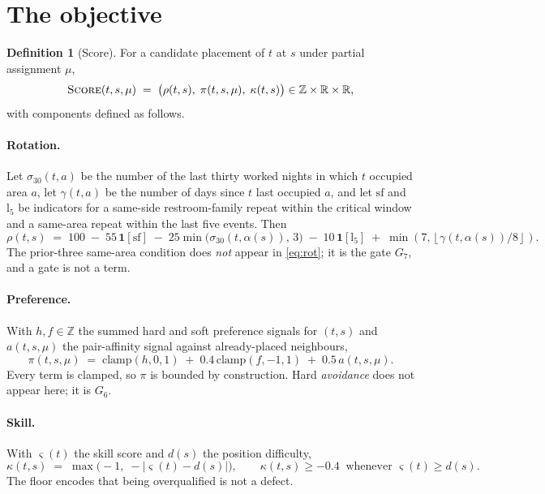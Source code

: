 \documentclass[11pt,a4paper]{article}
\theoremstyle{definition}
\newtheorem{definition}{Definition}
\theoremstyle{remark}
\newcommand{\ind}[1]{\mathbf{1}\!\left[#1\right]}
\newcommand{\score}{\textsc{Score}}
\begin{document}
\section{The objective}
\label{sec:objective}

\begin{definition}[Score]
For a candidate placement of $t$ at $s$ under partial assignment $\mu$,
\begin{equation}
\score(t, s, \mu) \;=\; \bigl(\rho(t,s),\; \pi(t,s,\mu),\; \kappa(t,s)\bigr)
\in \mathbb{Z} \times \mathbb{R} \times \mathbb{R},
\end{equation}
with components defined as follows.
\end{definition}

\paragraph{Rotation.} Let $\sigma_{30}(t,a)$ be the number of the last thirty
worked nights in which $t$ occupied area $a$, let $\gamma(t,a)$ be the number
of days since $t$ last occupied $a$, and let $\mathrm{sf}$ and $\mathrm{l}_5$
be indicators for a same-side restroom-family repeat within the critical
window and a same-area repeat within the last five events. Then
\begin{equation}
\label{eq:rot}
\rho(t,s) \;=\; 100
\;-\; 55\,\ind{\mathrm{sf}}
\;-\; 25 \min\bigl(\sigma_{30}(t, \alpha(s)),\, 3\bigr)
\;-\; 10\,\ind{\mathrm{l}_5}
\;+\; \min\!\left(7, \left\lfloor \gamma(t,\alpha(s))/8 \right\rfloor\right).
\end{equation}
The prior-three same-area condition does \emph{not} appear in
\eqref{eq:rot}; it is the gate $G_7$, and a gate is not a term.

\paragraph{Preference.} With $h, f \in \mathbb{Z}$ the summed hard and soft
preference signals for $(t,s)$ and $a(t,s,\mu)$ the pair-affinity signal
against already-placed neighbours,
\begin{equation}
\pi(t,s,\mu) \;=\; \mathrm{clamp}(h, 0, 1)
\;+\; 0.4\,\mathrm{clamp}(f, -1, 1)
\;+\; 0.5\,a(t,s,\mu).
\end{equation}
Every term is clamped, so $\pi$ is bounded by construction. Hard
\emph{avoidance} does not appear here; it is $G_6$.

\paragraph{Skill.} With $\varsigma(t)$ the skill score and $d(s)$ the
position difficulty,
\begin{equation}
\kappa(t,s) \;=\; \max\bigl(-1,\; -\lvert \varsigma(t) - d(s) \rvert\bigr),
\qquad
\kappa(t,s) \geq -0.4 \ \text{ whenever } \varsigma(t) \geq d(s).
\end{equation}
The floor encodes that being overqualified is not a defect.
\end{document}

